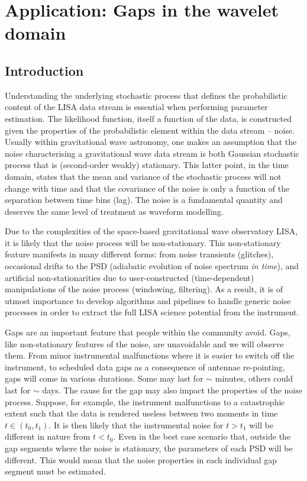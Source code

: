 \documentclass{article}
\begin{document}
\section{Application: Gaps in the wavelet domain}
\subsection{Introduction}
Understanding the underlying stochastic process that defines the probabilistic content of the LISA data stream is essential when performing parameter estimation. The likelihood function, itself a function of the data, is constructed given the properties of the probabilistic element within the data stream -- noise. Usually within gravitational wave astronomy, one makes an assumption that the noise characterising a gravitational wave data stream is both Gaussian stochastic process that is (second-order weakly) stationary. This latter point, in the time domain, states that the mean and variance of the stochastic process will not change with time and that the covariance of the noise is only a function of the separation between time bins (lag). The noise is a fundamental quantity and deserves the same level of treatment as waveform modelling. 

Due to the complexities of the space-based gravitational wave observatory LISA, it is likely that the noise process will be non-stationary. This non-stationary feature manifests in many different forms: from noise transients (glitches), occasional drifts to the PSD (adiabatic evolution of noise spectrum \emph{in time}), and artificial non-stationarities due to user-constructed (time-dependent) manipulations of the noise process (windowing, filtering). As a result, it is of utmost importance to develop algorithms and pipelines to handle generic noise processes in order to extract the full LISA science potential from the instrument. 

Gaps are an important feature that people within the community avoid. Gaps, like non-stationary features of the noise, are unavoidable and we will observe them. From minor instrumental malfunctions where it is easier to switch off the instrument, to scheduled data gaps as a consequence of antennae re-pointing, gaps will come in various durations. Some may last for $\sim$ minutes, others could last for $\sim$ days. The cause for the gap may also impact the properties of the noise process. Suppose, for example, the instrument malfunctions to a catastrophic extent such that the data is rendered useless between two moments in time $t \in (t_{0}, t_{1})$. It is then likely that the instrumental noise for $t > t_{1}$ will be different in nature from $t < t_{0}$. Even in the best case scenario that, outside the gap segments where the noise is stationary, the parameters of each PSD will be different. This would mean that the noise properties in each individual gap segment must be estimated. 
\end{document}
